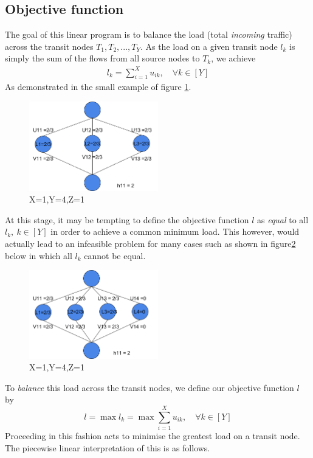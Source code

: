 \documentclass[12pt,twoside]{article}
\begin{document}
\subsection{Objective function}\label{Sec: objf}
The goal of this linear program is to balance the load (total \emph{incoming} traffic) across the transit nodes $T_1,T_2,...,T_Y$. As the load on a given transit node $l_k$ is simply the sum of the flows from all source nodes to $T_k$, we achieve
\begin{align*}
	l_k  = \sum_{i=1}^{X}u_{ik},   \quad  \forall k \in [Y]
\end{align*}
As demonstrated in the small example of figure \ref{131}.
\clearpage
\begin{figure}[htb]
	\centering
	\includegraphics[width=0.5\textwidth]{131.png}
	\caption{X=1,Y=4,Z=1}
	\label{131}
\end{figure}%

At this stage, it may be tempting to define the objective function $l$ as \emph{equal} to all $l_k, \ k \in [Y]$ in order to achieve a common minimum load. This however, would actually lead to an infeasible problem for many cases such as shown in figure\ref{141} below in which all $l_k$ cannot be equal.
\begin{figure}[htb]
	\centering
	\includegraphics[width=0.5\textwidth]{141.png}
	\caption{X=1,Y=4,Z=1}
	\label{141}
\end{figure}%

To \emph{balance} this load across the transit nodes, we define our objective function $l$ by
\begin{equation*}
 l = \max{l_k} = \max{\sum_{i=1}^{X}u_{ik}},   \quad  \forall k \in [Y]
\end{equation*}
Proceeding in this fashion acts to minimise the greatest load on a transit node. The piecewise linear interpretation of this is as follows.
\end{document}
